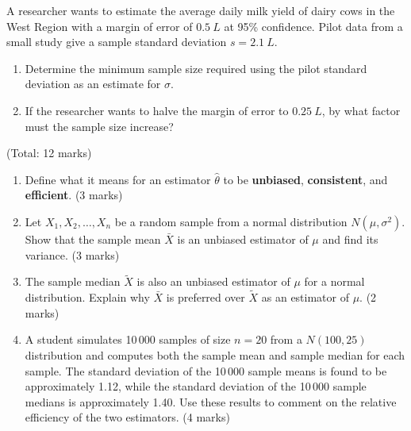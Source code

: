 \documentclass[11pt]{article}
\newcounter{popsec}
\newcounter{popsub}
\newcommand{\courssub}[1]{%
  \stepcounter{popsub}%
  \par\vspace{9pt}\noindent{\popxbold\fontsize{11.5}{13}\selectfont\color{popink}{\color{poporange}\thepopsec.\thepopsub}\hspace{6pt}#1}\par\nopagebreak\vspace{4pt}
}
\begin{document}
\begin{exercice}
A researcher wants to estimate the average daily milk yield of dairy cows in the West Region with a margin of error of $\SI{0.5}{L}$ at 95\% confidence. Pilot data from a small study give a sample standard deviation $s = \SI{2.1}{L}$.
\begin{enumerate}
\item Determine the minimum sample size required using the pilot standard deviation as an estimate for $\sigma$.
\item If the researcher wants to halve the margin of error to $\SI{0.25}{L}$, by what factor must the sample size increase?
\end{enumerate}
\end{exercice}

\courssub{I prepare for the GCE}

\begin{exercice} \hfill (Total: 12 marks)
\begin{enumerate}
\item Define what it means for an estimator $\hat{\theta}$ to be \textbf{unbiased}, \textbf{consistent}, and \textbf{efficient}. \hfill (3 marks)
\item Let $X_1, X_2, \dots, X_n$ be a random sample from a normal distribution $N(\mu, \sigma^2)$. Show that the sample mean $\bar{X}$ is an unbiased estimator of $\mu$ and find its variance. \hfill (3 marks)
\item The sample median $\tilde{X}$ is also an unbiased estimator of $\mu$ for a normal distribution. Explain why $\bar{X}$ is preferred over $\tilde{X}$ as an estimator of $\mu$. \hfill (2 marks)
\item A student simulates 10\,000 samples of size $n=20$ from a $N(100, 25)$ distribution and computes both the sample mean and sample median for each sample. The standard deviation of the 10\,000 sample means is found to be approximately 1.12, while the standard deviation of the 10\,000 sample medians is approximately 1.40. Use these results to comment on the relative efficiency of the two estimators. \hfill (4 marks)
\end{enumerate}
\end{exercice}
\end{document}
